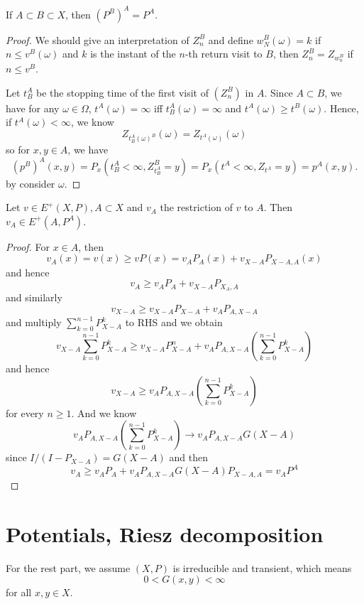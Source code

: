 \documentclass[lang=en,11pt,a4paper,citestyle =authoryear]{elegantpaper}
\begin{document}
\begin{theorem}
    If $A\subset B \subset X$, then $(P^B)^A = P^A$.
\end{theorem}
\begin{proof}
    We should give an interpretation of $Z_n^B$ and define $w_N^B(\omega) = k$ if $n\leq v^B(\omega)$ and $k$ is the instant of the $n$-th return visit to $B$, then $Z_n^B = Z_{w_n^B}$ if $n \leq v^B$.\par
    Let $t^A_B$ be the stopping time of the first visit of $(Z_n^B)$ in $A$. Since $A\subset B$, we have for any $\omega \in \Omega$, $t^A(\omega) = \infty$ iff $t^A_B(\omega) = \infty$ and $t^A(\omega) \geq t^B(\omega)$. Hence, if $t^A(\omega) < \infty$, we know
    \[
    Z_{t_B^A(\omega)^B}(\omega) = Z_{t^A(\omega)}(\omega)
    \]
    so for $x,y \in A$, we have
    \[
    (p^B)^A(x,y) = P_x(t_B^A < \infty, Z_{t_B^A}^B = y) = P_x(t^A < \infty, Z_{t^A} = y) = p^A(x,y).
    \]
    by consider $\omega$.
\end{proof}

\begin{theorem}
    Let $v\in E^+(X,P), A\subset X$ and $v_A$ the restriction of $v$ to $A$. Then $v_A \in E^+(A,P^A)$.
\end{theorem}
\begin{proof}
    For $x\in A$, then
    \[v_A(x) = v(x )\geq vP(x) = v_AP_A(x) + v_{X-A}P_{X-A, A}(x)\]
    and hence
    \[
    v_A \geq v_AP_A + v_{X-A}P_{X_A,A}
    \]
    and similarly
    \[
    v_{X-A} \geq v_{X-A}P_{X-A} + v_AP_{A,X-A}
    \]
    and multiply $\sum\limits_{k=0}^{n-1}P_{X-A}^k$ to RHS and we obtain
    \[
    v_{X-A}\sum\limits_{k=0}^{n-1}P_{X-A}^k \geq v_{X-A}P_{X-A}^n + v_AP_{A,X-A}(\sum\limits_{k=0}^{n-1}P_{X-A}^k)
    \]
    and hence
    \[
    v_{X-A} \geq v_AP_{A,X-A}(\sum\limits_{k=0}^{n-1}P_{X-A}^k)
    \]
    for every $n\geq 1$. And we know
    \[v_AP_{A,X-A}(\sum\limits_{k=0}^{n-1}P_{X-A}^k) \to v_AP_{A,X-A} G(X-A)\]
    since $I/(I-P_{X-A}) = G(X-A)$ and then
    \[
    v_A \geq v_AP_A + v_AP_{A,X-A}G(X-A)P_{X-A,A} = v_AP^A
    \]
\end{proof}

\section{Potentials, Riesz decomposition}

For the rest part, we assume $(X,P)$ is irreducible and transient, which means
    \[0 < G(x,y) < \infty\]
for all $x,y \in X$.\par
\end{document}
